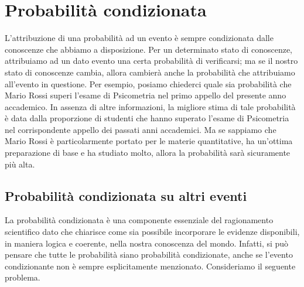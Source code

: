 \chapter{Probabilità condizionata}
\label{chapter:prob_cond} 

%
%

L'attribuzione di una probabilità ad un evento è sempre condizionata dalle conoscenze che abbiamo a disposizione.  
Per un determinato stato di conoscenze, attribuiamo ad un dato evento una certa probabilità di verificarsi; ma se il nostro stato di conoscenze cambia, allora cambierà anche la probabilità che attribuiamo all'evento in questione. 
Per esempio, posiamo chiederci quale sia probabilità che Mario Rossi superi l'esame di Psicometria nel primo appello del presente anno accademico.  
In assenza di altre informazioni, la migliore stima di tale probabilità è data dalla proporzione di studenti che hanno superato l'esame di Psicometria nel corrispondente appello dei passati anni accademici. 
Ma se sappiamo che Mario Rossi è particolarmente portato per le materie quantitative, ha un'ottima preparazione di base e ha studiato molto, allora la probabilità sarà sicuramente più alta.


\section{Probabilità condizionata su altri eventi}
\label{sec:prob_cond}

La probabilità condizionata è una componente essenziale del ragionamento scientifico dato che chiarisce come sia possibile incorporare le evidenze disponibili, in maniera logica e coerente, nella nostra conoscenza del mondo.
Infatti, si può pensare che tutte le probabilità siano probabilità condizionate, anche se l'evento condizionante non è sempre esplicitamente menzionato. 
Consideriamo il seguente problema.

